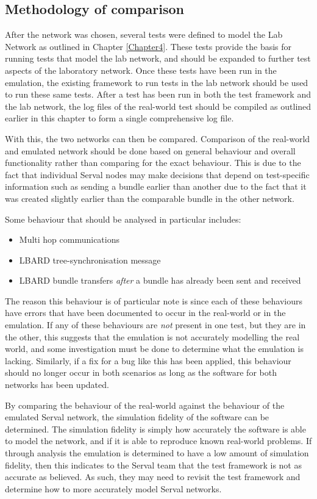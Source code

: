 \subsection{Methodology of comparison}
After the network was chosen, several tests were defined to model the Lab Network as outlined in Chapter \ref{Chapter4}.
These tests provide the basis for running tests that model the lab network, and should be expanded to further test aspects of the laboratory network.
Once these tests have been run in the emulation, the existing framework to run tests in the lab network should be used to run these same tests.
After a test has been run in both the test framework and the lab network, the log files of the real-world test should be compiled as outlined earlier in this chapter to form a single comprehensive log file.

With this, the two networks can then be compared.
Comparison of the real-world and emulated network should be done based on general behaviour and overall functionality rather than comparing for the exact behaviour.
This is due to the fact that individual Serval nodes may make decisions that depend on test-specific information such as sending a bundle earlier than another due to the fact that it was created slightly earlier than the comparable bundle in the other network.

Some behaviour that should be analysed in particular includes:
\begin{itemize}
    \item Multi hop communications
    \item LBARD tree-synchronisation message
    \item LBARD bundle transfers \emph{after} a bundle has already been sent and received
\end{itemize}

The reason this behaviour is of particular note is since each of these behaviours have errors that have been documented to occur in the real-world or in the emulation.
If any of these behaviours are \emph{not} present in one test, but they are in the other, this suggests that the emulation is not accurately modelling the real world, and some investigation must be done to determine what the emulation is lacking.
Similarly, if a fix for a bug like this has been applied, this behaviour should no longer occur in both scenarios as long as the software for both networks has been updated.


By comparing the behaviour of the real-world against the behaviour of the emulated Serval network, the simulation fidelity of the software can be determined.
The simulation fidelity is simply how accurately the software is able to model the network, and if it is able to reproduce known real-world problems.
If through analysis the emulation is determined to have a low amount of simulation fidelity, then this indicates to the Serval team that the test framework is not as accurate as believed.
As such, they may need to revisit the test framework and determine how to more accurately model Serval networks.

